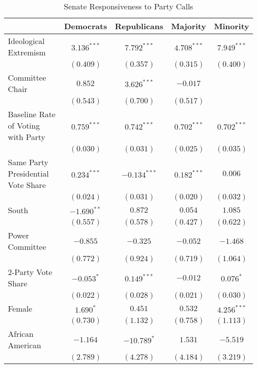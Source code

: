 \documentclass[12pt]{article}
\begin{document}
\begin{table}[H]
	\begin{center}
		\singlespacing
		\small
		\caption{Senate Responsiveness to Party Calls}
		\begin{tabular}{l c c c c }
			\hline
			& Democrats & Republicans & Majority & Minority \\
			\hline
			Ideological Extremism & $3.136^{***}$  & $7.792^{***}$   & $4.708^{***}$  & $7.949^{***}$ \\
			& $(0.409)$      & $(0.357)$       & $(0.315)$      & $(0.400)$     \\
			Committee Chair                  & $0.852$        & $3.626^{***}$   & $-0.017$       &               \\
			& $(0.543)$      & $(0.700)$       & $(0.517)$      &               \\
			Baseline Rate of Voting with Party              & $0.759^{***}$  & $0.742^{***}$   & $0.702^{***}$  & $0.702^{***}$ \\
			& $(0.030)$      & $(0.031)$       & $(0.025)$      & $(0.035)$     \\
			Same Party Presidential Vote Share      & $0.234^{***}$ & $-0.134^{***}$ & $0.182^{***}$  & $0.006$       \\
			& $(0.024)$     & $(0.031)$      & $(0.020)$      & $(0.032)$     \\
			South                  & $-1.690^{**}$  & $0.872$         & $0.054$        & $1.085$       \\
			& $(0.557)$      & $(0.578)$       & $(0.427)$      & $(0.622)$     \\
			Power Committee       & $-0.855$       & $-0.325$        & $-0.052$       & $-1.468$      \\
			& $(0.772)$      & $(0.924)$       & $(0.719)$      & $(1.064)$     \\
			2-Party Vote Share            & $-0.053^{*}$  & $0.149^{***}$  & $-0.012$       & $0.076^{*}$   \\
			& $(0.022)$     & $(0.028)$      & $(0.021)$      & $(0.030)$     \\
			Female                 & $1.690^{*}$    & $0.451$         & $0.532$        & $4.256^{***}$ \\
			& $(0.730)$      & $(1.132)$       & $(0.758)$      & $(1.113)$     \\
			African American                   & $-1.164$       & $-10.789^{*}$   & $1.531$        & $-5.519$      \\
			& $(2.789)$      & $(4.278)$       & $(4.184)$      & $(3.219)$     \\

\end{tabular}
\end{center}
\end{table}
\end{document}
